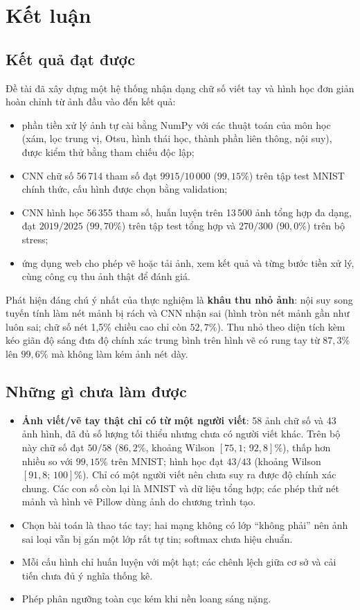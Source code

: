 \chapter{Kết luận}

\section{Kết quả đạt được}
Đề tài đã xây dựng một hệ thống nhận dạng chữ số viết tay và hình học đơn giản hoàn chỉnh từ ảnh đầu vào đến kết quả:
\begin{itemize}
\item phần tiền xử lý ảnh tự cài bằng NumPy với các thuật toán của môn học (xám, lọc trung vị, Otsu, hình thái học, thành phần liên thông, nội suy), được kiểm thử bằng tham chiếu độc lập;
\item CNN chữ số 56\,714 tham số đạt $9915/10\,000$ ($99{,}15\%$) trên tập test MNIST chính thức, cấu hình được chọn bằng validation;
\item CNN hình học 56\,355 tham số, huấn luyện trên 13\,500 ảnh tổng hợp đa dạng, đạt $2019/2025$ ($99{,}70\%$) trên tập test tổng hợp và $270/300$ ($90{,}0\%$) trên bộ stress;
\item ứng dụng web cho phép vẽ hoặc tải ảnh, xem kết quả và từng bước tiền xử lý, cùng công cụ thu ảnh thật để đánh giá.
\end{itemize}
Phát hiện đáng chú ý nhất của thực nghiệm là \textbf{khâu thu nhỏ ảnh}: nội suy song tuyến tính làm nét mảnh bị rách và CNN nhận sai (hình tròn nét mảnh gần như luôn sai; chữ số nét 1,5\% chiều cao chỉ còn $52{,}7\%$).
Thu nhỏ theo diện tích kèm kéo giãn độ sáng đưa độ chính xác trung bình trên hình vẽ có rung tay từ $87{,}3\%$ lên $99{,}6\%$ mà không làm kém ảnh nét dày.

\section{Những gì chưa làm được}
\begin{itemize}
\item \textbf{Ảnh viết/vẽ tay thật chỉ có từ một người viết}: 58 ảnh chữ số và 43 ảnh hình, đã đủ số lượng tối thiểu nhưng chưa có người viết khác. Trên bộ này chữ số đạt $50/58$ ($86{,}2\%$, khoảng Wilson $[75{,}1;\,92{,}8]\%$), thấp hơn nhiều so với $99{,}15\%$ trên MNIST; hình học đạt $43/43$ (khoảng Wilson $[91{,}8;\,100]\%$). Chỉ có một người viết nên chưa suy ra được độ chính xác chung. Các con số còn lại là MNIST và dữ liệu tổng hợp; các phép thử nét mảnh và hình vẽ Pillow dùng ảnh do chương trình tạo.
\item Chọn bài toán là thao tác tay; hai mạng không có lớp ``không phải'' nên ảnh sai loại vẫn bị gán một lớp rất tự tin; softmax chưa hiệu chuẩn.
\item Mỗi cấu hình chỉ huấn luyện với một hạt; các chênh lệch giữa cơ sở và cải tiến chưa đủ ý nghĩa thống kê.
\item Phép phân ngưỡng toàn cục kém khi nền loang sáng nặng.
\end{itemize}

